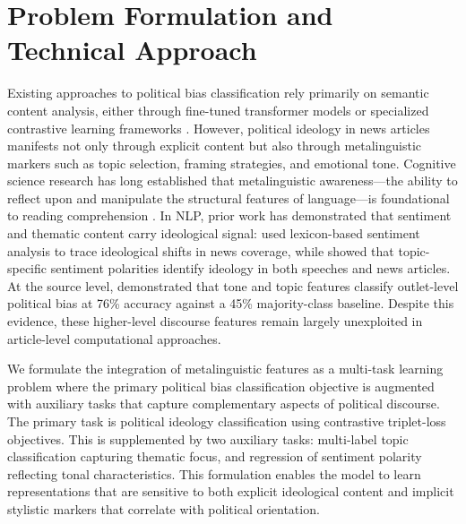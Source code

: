 
\section{Problem Formulation and Technical Approach}
\label{sec:problem-formulation}

Existing approaches to political bias classification rely primarily on semantic content analysis, either through fine-tuned transformer models or specialized contrastive learning frameworks \citep{baly2020we, liu2022politics}. However, political ideology in news articles manifests not only through explicit content but also through metalinguistic markers such as topic selection, framing strategies, and emotional tone. Cognitive science research has long established that metalinguistic awareness---the ability to reflect upon and manipulate the structural features of language---is foundational to reading comprehension \citep{tunmer1984development, nagy2007metalinguistic, Zipke10092007}. In NLP, prior work has demonstrated that sentiment and thematic content carry ideological signal: \citet{smirnova2017ideology} used lexicon-based sentiment analysis to trace ideological shifts in news coverage, while \citet{bhatia2018topic} showed that topic-specific sentiment polarities identify ideology in both speeches and news articles. At the source level, \citet{ronnback2025biasoutlets} demonstrated that tone and topic features classify outlet-level political bias at 76\% accuracy against a 45\% majority-class baseline. Despite this evidence, these higher-level discourse features remain largely unexploited in article-level computational approaches.

We formulate the integration of metalinguistic features as a multi-task learning problem where the primary political bias classification objective is augmented with auxiliary tasks that capture complementary aspects of political discourse. The primary task is political ideology classification using contrastive triplet-loss objectives. This is supplemented by two auxiliary tasks: multi-label topic classification capturing thematic focus, and regression of sentiment polarity reflecting tonal characteristics. This formulation enables the model to learn representations that are sensitive to both explicit ideological content and implicit stylistic markers that correlate with political orientation.

